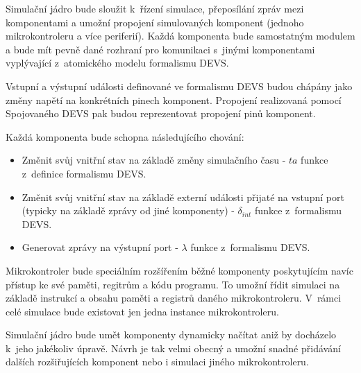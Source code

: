 Simulační jádro bude sloužit k~řízení simulace, přeposílání zpráv mezi komponentami a umožní propojení simulovaných komponent (jednoho mikrokontroleru a více periferií). Každá komponenta bude samostatným modulem a bude mít pevně dané rozhraní pro komunikaci s~jinými komponentami vyplývající z~atomického modelu formalismu DEVS.

Vstupní a výstupní události definované ve formalismu DEVS budou chápány jako změny napětí na konkrétních pinech komponent. Propojení realizovaná pomocí Spojovaného DEVS pak budou reprezentovat propojení pinů komponent.

Každá komponenta bude schopna následujícího chování:

\begin{itemize}
\item Změnit svůj vnitřní stav na základě změny simulačního času - $ta$ funkce z~definice formalismu DEVS.
\item Změnit svůj vnitřní stav na základě externí události přijaté na vstupní port (typicky na základě zprávy od jiné komponenty) - $\delta_{int}$ funkce z~formalismu DEVS.
\item Generovat zprávy na výstupní port - $\lambda$ funkce z~formalismu DEVS.
\end{itemize}

Mikrokontroler bude speciálním rozšířením běžné komponenty poskytujícím navíc přístup ke své paměti, regitrům a kódu programu. To umožní řídit simulaci na základě instrukcí a obsahu paměti a registrů daného mikrokontroleru. V~rámci celé simulace bude existovat jen jedna instance mikrokontroleru.

Simulační jádro bude umět komponenty dynamicky načítat aniž by docházelo k~jeho jakékoliv úpravě. Návrh je tak velmi obecný a umožní snadné přidávání dalších rozšiřujících komponent nebo i simulaci jiného mikrokontroleru.

